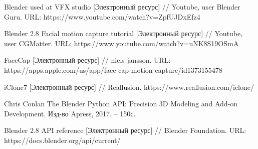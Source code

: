 \begingroup 
\renewcommand{\section}[2]{\anonsection{Библиографический список}}
\begin{thebibliography}{00}
	Blender used at VFX studio
	[Электронный ресурс] //
	Youtube, user Blender Guru.
	URL: https://www.youtube.com/watch?v=ZpfUJDxEfz4

    Blender 2.8 Facial motion capture tutorial
    [Электронный ресурс] //
    Youtube, user CGMatter.
    URL: https://www.youtube.com/watch?v=uNK8S19OSmA
    
	FaceCap
	[Электронный ресурс] //
	niels jansson.	
	URL: https://apps.apple.com/us/app/face-cap-motion-capture/id1373155478

	iClone7
	[Электронный ресурс] //
	Reallusion.
	https://www.reallusion.com/iclone/
    
	Chris Conlan
	The Blender Python API: Precision 3D Modeling and Add-on Development.
	Изд-во Apress, 2017. -- 150с.

	Blender 2.8 API reference
	[Электронный ресурс] //
	Blender Foundation.
	URL: https://docs.blender.org/api/current/
	
	

\end{thebibliography}
\endgroup

\clearpage
